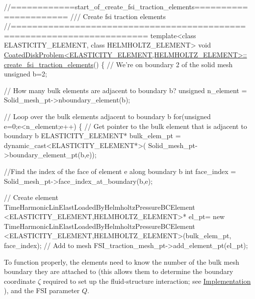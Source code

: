  
\begin{DoxyCodeInclude}
\textcolor{comment}{//============start\_of\_create\_fsi\_traction\_elements======================}
\textcolor{comment}{/// Create fsi traction elements }
\textcolor{comment}{}\textcolor{comment}{//=======================================================================}
\textcolor{keyword}{template}<\textcolor{keyword}{class} ELASTICITY\_ELEMENT, \textcolor{keyword}{class} HELMHOLTZ\_ELEMENT>
\textcolor{keywordtype}{void} \hyperlink{classCoatedDiskProblem_a143908e8db74ad6bd8b7efaaa26c78c3}{CoatedDiskProblem<ELASTICITY\_ELEMENT,HELMHOLTZ\_ELEMENT>::}
\hyperlink{classCoatedDiskProblem_a143908e8db74ad6bd8b7efaaa26c78c3}{create\_fsi\_traction\_elements}()
\{
 \textcolor{comment}{// We're on boundary 2 of the solid mesh}
 \textcolor{keywordtype}{unsigned} b=2;

 \textcolor{comment}{// How many bulk elements are adjacent to boundary b?}
 \textcolor{keywordtype}{unsigned} n\_element = Solid\_mesh\_pt->nboundary\_element(b);
 
 \textcolor{comment}{// Loop over the bulk elements adjacent to boundary b}
 \textcolor{keywordflow}{for}(\textcolor{keywordtype}{unsigned} e=0;e<n\_element;e++)
  \{
   \textcolor{comment}{// Get pointer to the bulk element that is adjacent to boundary b}
   ELASTICITY\_ELEMENT* bulk\_elem\_pt = \textcolor{keyword}{dynamic\_cast<}ELASTICITY\_ELEMENT*\textcolor{keyword}{>}(
    Solid\_mesh\_pt->boundary\_element\_pt(b,e));
   
   \textcolor{comment}{//Find the index of the face of element e along boundary b}
   \textcolor{keywordtype}{int} face\_index = Solid\_mesh\_pt->face\_index\_at\_boundary(b,e);
   
   \textcolor{comment}{// Create element}
   TimeHarmonicLinElastLoadedByHelmholtzPressureBCElement
    <ELASTICITY\_ELEMENT,HELMHOLTZ\_ELEMENT>* el\_pt=
    \textcolor{keyword}{new} TimeHarmonicLinElastLoadedByHelmholtzPressureBCElement
    <ELASTICITY\_ELEMENT,HELMHOLTZ\_ELEMENT>(bulk\_elem\_pt,
                                           face\_index);   
   \textcolor{comment}{// Add to mesh}
   FSI\_traction\_mesh\_pt->add\_element\_pt(el\_pt);

\end{DoxyCodeInclude}


To function properly, the elements need to know the number of the bulk mesh boundary they are attached to (this allows them to determine the boundary coordinate $ \zeta $ required to set up the fluid-\/structure interaction; see \hyperlink{index_impl}{Implementation} ), and the F\+SI parameter $ Q $.


